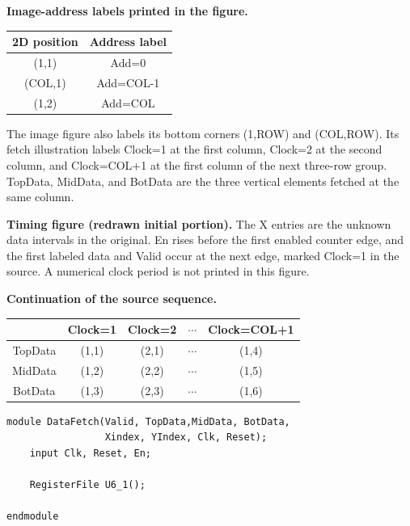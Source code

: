 \documentclass[11pt,a4paper]{article}
\newcommand{\bus}[3]{%
  \draw (#2,#1)--({#2+.13},{#1+.17})--({#2+.87},{#1+.17})--({#2+1},#1)
    --({#2+.87},{#1-.17})--({#2+.13},{#1-.17})--cycle;
  \node[font=\scriptsize] at ({#2+.5},#1) {#3};}
\newcommand{\clockrow}[2]{%
  \node[anchor=east,font=\small] at (-.2,#1) {Clk};
  \foreach \i in {0,...,#2} {
    \draw (\i,#1)--(\i,{#1+.3})--({\i+.5},{#1+.3})--({\i+.5},#1)--({\i+1},#1);}}
\begin{document}
\textbf{Image-address labels printed in the figure.}
\begin{center}
\begin{tabular}{c|c}\toprule
2D position & Address label\\\midrule
(1,1) & Add=0\\
(COL,1) & Add=COL-1\\
(1,2) & Add=COL\\\bottomrule
\end{tabular}
\end{center}
The image figure also labels its bottom corners (1,ROW) and (COL,ROW).
Its fetch illustration labels Clock=1 at the first column, Clock=2 at
the second column, and Clock=COL+1 at the first column of the next
three-row group. TopData, MidData, and BotData are the three vertical
elements fetched at the same column.

\textbf{Timing figure (redrawn initial portion).} The X entries are the
unknown data intervals in the original. En rises before the first enabled
counter edge, and the first labeled data and Valid occur at the next
edge, marked Clock=1 in the source. A numerical clock period is not
printed in this figure.
\begin{center}
\end{center}
\textbf{Continuation of the source sequence.}
\begin{center}
\begin{tabular}{c|cccc}\toprule
 & Clock=1 & Clock=2 & $\cdots$ & Clock=COL+1\\\midrule
TopData & (1,1) & (2,1) & $\cdots$ & (1,4)\\
MidData & (1,2) & (2,2) & $\cdots$ & (1,5)\\
BotData & (1,3) & (2,3) & $\cdots$ & (1,6)\\\bottomrule
\end{tabular}
\end{center}
\begin{verbatim}
module DataFetch(Valid, TopData,MidData, BotData,
                 Xindex, YIndex, Clk, Reset);
    input Clk, Reset, En;

    RegisterFile U6_1();

endmodule
\end{verbatim}
\end{document}
